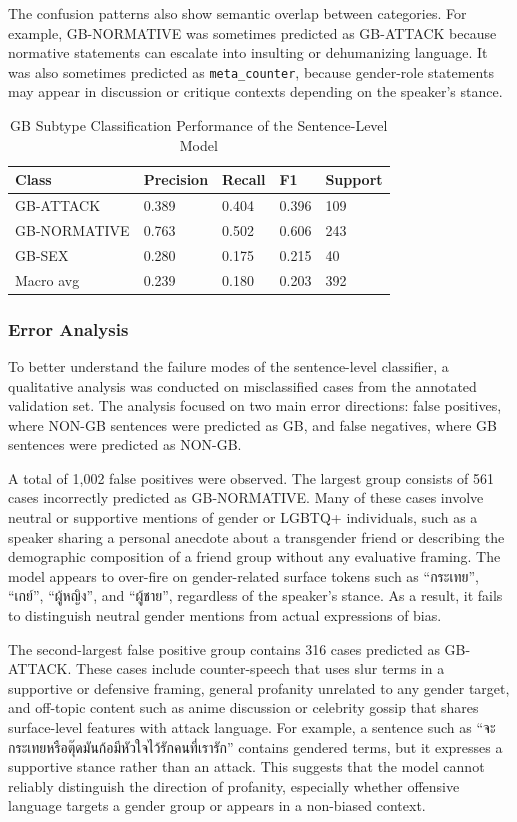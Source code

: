 \documentclass[12pt,oneside,openright,a4paper]{cpe-english-project}
\begin{document}
The confusion patterns also show semantic overlap between categories. For example, GB-NORMATIVE was sometimes predicted as GB-ATTACK because normative statements can escalate into insulting or dehumanizing language. It was also sometimes predicted as \texttt{meta\_counter}, because gender-role statements may appear in discussion or critique contexts depending on the speaker's stance.

\begin{table}[H]
\centering
\small
\caption{GB Subtype Classification Performance of the Sentence-Level Model}
\begin{tabular}{@{}lllll@{}}
\toprule
Class & Precision & Recall & F1 & Support \\
\midrule
GB-ATTACK & 0.389 & 0.404 & 0.396 & 109 \\
GB-NORMATIVE & 0.763 & 0.502 & 0.606 & 243 \\
GB-SEX & 0.280 & 0.175 & 0.215 & 40 \\
Macro avg & 0.239 & 0.180 & 0.203 & 392 \\
\bottomrule
\end{tabular}
\end{table}

\subsubsection{Error Analysis}

To better understand the failure modes of the sentence-level classifier, a qualitative analysis was conducted on misclassified cases from the annotated validation set. The analysis focused on two main error directions: false positives, where NON-GB sentences were predicted as GB, and false negatives, where GB sentences were predicted as NON-GB.

A total of 1,002 false positives were observed. The largest group consists of 561 cases incorrectly predicted as GB-NORMATIVE. Many of these cases involve neutral or supportive mentions of gender or LGBTQ+ individuals, such as a speaker sharing a personal anecdote about a transgender friend or describing the demographic composition of a friend group without any evaluative framing. The model appears to over-fire on gender-related surface tokens such as ``กระเทย'', ``เกย์'', ``ผู้หญิง'', and ``ผู้ชาย'', regardless of the speaker's stance. As a result, it fails to distinguish neutral gender mentions from actual expressions of bias.

The second-largest false positive group contains 316 cases predicted as GB-ATTACK. These cases include counter-speech that uses slur terms in a supportive or defensive framing, general profanity unrelated to any gender target, and off-topic content such as anime discussion or celebrity gossip that shares surface-level features with attack language. For example, a sentence such as ``จะกระเทยหรือตุ๊ดมันก้อมีหัวใจไว้รักคนที่เรารัก'' contains gendered terms, but it expresses a supportive stance rather than an attack. This suggests that the model cannot reliably distinguish the direction of profanity, especially whether offensive language targets a gender group or appears in a non-biased context.
\end{document}
